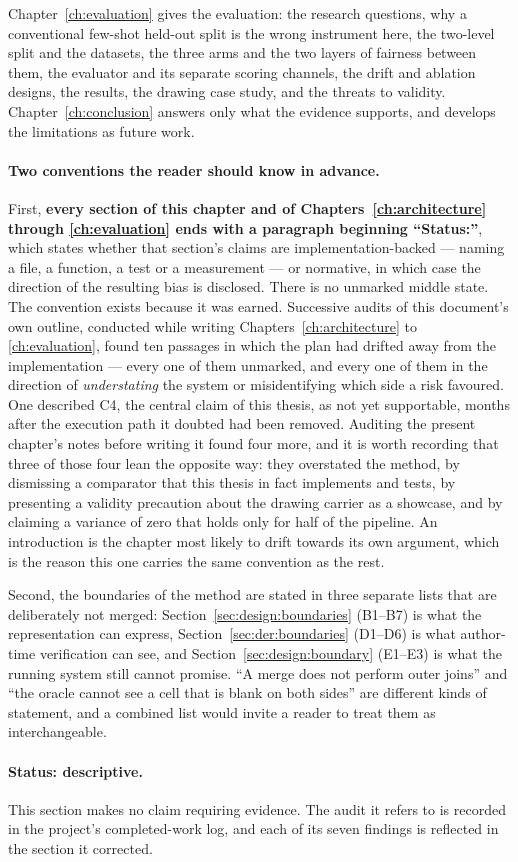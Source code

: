 Chapter~\ref{ch:evaluation} gives the evaluation: the research questions, why a conventional
few-shot held-out split is the wrong instrument here, the two-level split and the datasets, the
three arms and the two layers of fairness between them, the evaluator and its separate scoring
channels, the drift and ablation designs, the results, the drawing case study, and the threats
to validity. Chapter~\ref{ch:conclusion} answers only what the evidence supports, and develops
the limitations as future work.

\paragraph{Two conventions the reader should know in advance.}
First, \textbf{every section of this chapter and of Chapters~\ref{ch:architecture} through
\ref{ch:evaluation} ends with a paragraph beginning ``Status:''}, which states whether that
section's claims are implementation-backed --- naming a file, a function, a test or a
measurement --- or normative, in which case the direction of the resulting bias is disclosed.
There is no unmarked middle state. The convention exists because it was earned. Successive
audits of this document's own outline, conducted while writing Chapters~\ref{ch:architecture}
to \ref{ch:evaluation}, found ten passages in which the plan had drifted away from the
implementation --- every one of them unmarked, and every one of them in the direction of
\emph{understating} the system or misidentifying which side a risk favoured. One described C4,
the central claim of this thesis, as not yet supportable, months after the execution path it
doubted had been removed. Auditing the present chapter's notes before writing it found four
more, and it is worth recording that three of those four lean the opposite way: they overstated
the method, by dismissing a comparator that this thesis in fact implements and tests, by
presenting a validity precaution about the drawing carrier as a showcase, and by claiming a
variance of zero that holds only for half of the pipeline. An introduction is the chapter most
likely to drift towards its own argument, which is the reason this one carries the same
convention as the rest.

Second, the boundaries of the method are stated in three separate lists that are deliberately
not merged: Section~\ref{sec:design:boundaries} (B1--B7) is what the representation can
express, Section~\ref{sec:der:boundaries} (D1--D6) is what author-time verification can see,
and Section~\ref{sec:design:boundary} (E1--E3) is what the running system still cannot promise.
``A merge does not perform outer joins'' and ``the oracle cannot see a cell that is blank on
both sides'' are different kinds of statement, and a combined list would invite a reader to
treat them as interchangeable.

\paragraph{Status: descriptive.}
This section makes no claim requiring evidence. The audit it refers to is recorded in the
project's completed-work log, and each of its seven findings is reflected in the section it
corrected.

